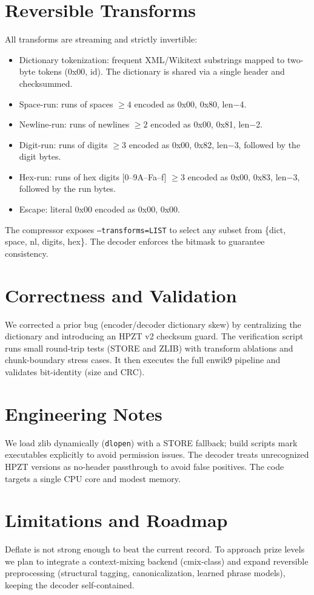 \documentclass[11pt]{article}
\begin{document}
\section{Reversible Transforms}
All transforms are streaming and strictly invertible:
\begin{itemize}[noitemsep]
  \item Dictionary tokenization: frequent XML/Wikitext substrings mapped to two-byte tokens (0x00, id). The dictionary is shared via a single header and checksummed.
  \item Space-run: runs of spaces $\ge 4$ encoded as 0x00, 0x80, len$-$4.
  \item Newline-run: runs of newlines $\ge 2$ encoded as 0x00, 0x81, len$-$2.
  \item Digit-run: runs of digits $\ge 3$ encoded as 0x00, 0x82, len$-$3, followed by the digit bytes.
  \item Hex-run: runs of hex digits [0--9A--Fa--f] $\ge 3$ encoded as 0x00, 0x83, len$-$3, followed by the run bytes.
  \item Escape: literal 0x00 encoded as 0x00, 0x00.
\end{itemize}
The compressor exposes \texttt{--transforms=LIST} to select any subset from \{dict, space, nl, digits, hex\}. The decoder enforces the bitmask to guarantee consistency.

\section{Correctness and Validation}
We corrected a prior bug (encoder/decoder dictionary skew) by centralizing the dictionary and introducing an HPZT v2 checksum guard. The verification script runs small round-trip tests (STORE and ZLIB) with transform ablations and chunk-boundary stress cases. It then executes the full enwik9 pipeline and validates bit-identity (size and CRC).

\section{Engineering Notes}
We load zlib dynamically (\texttt{dlopen}) with a STORE fallback; build scripts mark executables explicitly to avoid permission issues. The decoder treats unrecognized HPZT versions as no-header passthrough to avoid false positives. The code targets a single CPU core and modest memory.

\section{Limitations and Roadmap}
Deflate is not strong enough to beat the current record. To approach prize levels we plan to integrate a context-mixing backend (cmix-class) and expand reversible preprocessing (structural tagging, canonicalization, learned phrase models), keeping the decoder self-contained.
\end{document}
